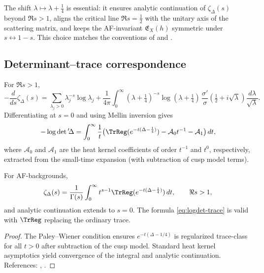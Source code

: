 \begin{remark}[Normalization]\label{rem:det-norm}
The shift $\lambda\mapsto \lambda+\tfrac14$ is essential: it ensures
analytic continuation of $\zeta_\Delta(s)$ beyond $\Re s>1$, aligns the
critical line $\Re s=\tfrac12$ with the unitary axis of the scattering
matrix, and keeps the AF-invariant $\mathfrak{E}_X(h)$ symmetric under
$s\leftrightarrow 1-s$. This choice matches the conventions of
\cite{HejhalII} and \cite{Borthwick}.                                   %
\end{remark}

\subsection{Determinant–trace correspondence}
\label{subsec:det-trace}
\relax\hspace{0pt}

For $\Re s>1$,
\[
-\frac{d}{ds}\zeta_\Delta(s)
= \sum_{\lambda_j>0}\lambda_j^{-s}\log\lambda_j
+\frac{1}{4\pi}\int_0^\infty (\lambda+\tfrac14)^{-s}
\log(\lambda+\tfrac14)\,
\frac{\sigma'}{\sigma}\!\left(\tfrac12+i\sqrt{\lambda}\right)
\frac{d\lambda}{\sqrt{\lambda}}.
\]
Differentiating at $s=0$ and using Mellin inversion gives
\begin{equation}\label{eq:logdet-trace}
-\log\det{}'\!\Delta
=\int_0^\infty
\frac{1}{t}\big(\TrReg(e^{-t(\Delta-\frac14)}) - \mathcal{A}_0 t^{-1} - \mathcal{A}_1\big)\,dt,
\end{equation}
where $\mathcal{A}_0$ and $\mathcal{A}_1$ are the heat kernel coefficients
of order $t^{-1}$ and $t^0$, respectively, extracted from the small-time
expansion (with subtraction of cusp model terms).                        %

\begin{proposition}
\label{prop:heat-equivalence}
For AF-backgrounds,
\[
\zeta_\Delta(s)
=\frac{1}{\Gamma(s)}\int_0^\infty
t^{s-1}\TrReg(e^{-t(\Delta-\frac14)})\,dt,
\qquad \Re s>1,
\]
and analytic continuation extends to $s=0$. The formula
\eqref{eq:logdet-trace} is valid with $\TrReg$ replacing the ordinary
trace.                                                                   %
\end{proposition}

\begin{proof}
The Paley–Wiener condition ensures $e^{-t(\Delta-1/4)}$ is regularized
trace-class for all $t>0$ after subtraction of the cusp model. Standard
heat kernel asymptotics yield convergence of the integral and analytic
continuation. References:
\cite[Ch.~3]{Borthwick}, \cite{GuillopeZworski}.                        %
\end{proof}

